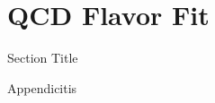 \chapter{QCD Flavor Fit }{\label{appendix:b}}
\begin{section}{Section Title}

Appendicitis

\end{section}
